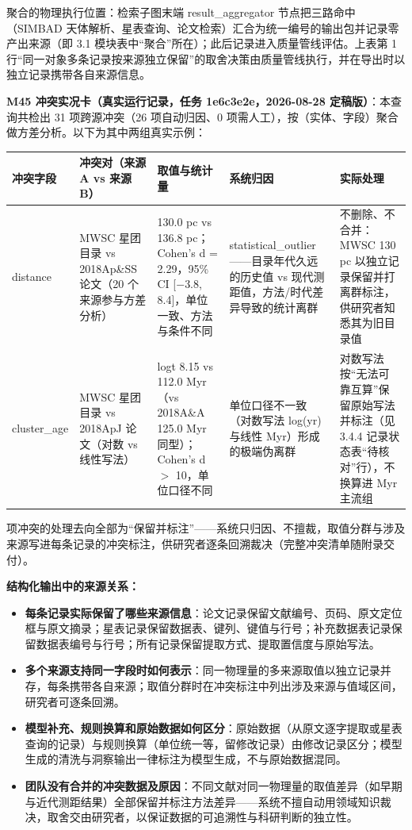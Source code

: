 \noindent 聚合的物理执行位置：检索子图末端 result\_aggregator 节点把三路命中（SIMBAD 天体解析、星表查询、论文检索）汇合为统一编号的输出包并记录零产出来源（即 3.1 模块表中“聚合”所在）；此后记录进入质量管线评估。上表第 1 行“同一对象多条记录按来源独立保留”的取舍决策由质量管线执行，并在导出时以独立记录携带各自来源信息。

\bigskip
\noindent\textbf{M45 冲突实况卡（真实运行记录，任务 1e6c3e2e，2026-08-28 定稿版）}：本查询共检出 31 项跨源冲突（26 项自动归因、0 项需人工），按（实体、字段）聚合做方差分析。以下为其中两组真实示例：

\begin{longtable}{@{}p{1.7cm}p{3.4cm}p{3.6cm}p{3.2cm}p{2.4cm}@{}}
\toprule
冲突字段 & 冲突对（来源 A vs 来源 B） & 取值与统计量 & 系统归因 & 实际处理 \\
\midrule
distance & MWSC 星团目录 vs 2018Ap\&SS 论文（20 个来源参与方差分析） & 130.0 pc vs 136.8 pc；Cohen's d = 2.29，95\% CI [$-$3.8, 8.4]，单位一致、方法与条件不同 & statistical\_outlier——目录年代久远的历史值 vs 现代测距值，方法/时代差异导致的统计离群 & 不删除、不合并：MWSC 130 pc 以独立记录保留并打离群标注，供研究者知悉其为旧目录值 \\
cluster\_age & MWSC 星团目录 vs 2018ApJ 论文（对数 vs 线性写法） & logt 8.15 vs 112.0 Myr（vs 2018A\&A 125.0 Myr 同型）；Cohen's d $>$ 10，单位口径不同 & 单位口径不一致（对数写法 log(yr) 与线性 Myr）形成的极端伪离群 & 对数写法按“无法可靠互算”保留原始写法并标注（见 3.4.4 记录状态表“待核对”行），不换算进 Myr 主流组 \\
\bottomrule
\end{longtable}

 项冲突的处理去向全部为“保留并标注”——系统只归因、不擅裁，取值分群与涉及来源写进每条记录的冲突标注，供研究者逐条回溯裁决（完整冲突清单随附录交付）。

\bigskip
\noindent\textbf{结构化输出中的来源关系：}

\begin{itemize}[leftmargin=1.2em,itemsep=2pt]
\item \textbf{每条记录实际保留了哪些来源信息}：论文记录保留文献编号、页码、原文定位框与原文摘录；星表记录保留数据表、键列、键值与行号；补充数据表记录保留数据表编号与行号；所有记录保留提取方式、提取置信度与原始写法。
\item \textbf{多个来源支持同一字段时如何表示}：同一物理量的多来源取值以独立记录并存，每条携带各自来源；取值分群时在冲突标注中列出涉及来源与值域区间，研究者可逐条回溯。
\item \textbf{模型补充、规则换算和原始数据如何区分}：原始数据（从原文逐字提取或星表查询的记录）与规则换算（单位统一等，留修改记录）由修改记录区分；模型生成的清洗与洞察输出一律标注为模型生成，不与原始数据混同。
\item \textbf{团队没有合并的冲突数据及原因}：不同文献对同一物理量的取值差异（如早期与近代测距结果）全部保留并标注方法差异——系统不擅自动用领域知识裁决，取舍交由研究者，以保证数据的可追溯性与科研判断的独立性。
\end{itemize}

